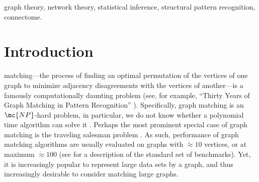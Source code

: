 \documentclass[10pt,journal,cspaper,compsoc]{IEEEtran}
\begin{document}
{%
\begin{keywords}
graph theory, network theory, statistical inference, structural pattern recognition, connectome.
\end{keywords}}


\maketitle
\IEEEdisplaynotcompsoctitleabstractindextext
\IEEEpeerreviewmaketitle



\section{Introduction}

 matching---the process of finding an optimal permutation of the vertices of one graph to minimize adjacency disagreements with the vertices of another---is a famously computationally daunting problem (see, for example, ``Thirty Years of Graph Matching in Pattern Recognition''  \cite{Conte2004}). Specifically, graph matching is an $\mc{NP}$-hard problem, in particular, we do not know whether a polynomial time algorithm can solve it \cite{Papadimitriou1998}.  Perhaps the most prominent special case of graph matching is the traveling salesman problem \cite{Burkard2009}. As such, performance of graph matching algorithms are usually evaluated on graphs with $\dot{\approx} 10$ vertices, or at maximum $\dot{\approx} 100$ (see \cite{Burkard1997} for a description of the standard set of benchmarks).  Yet, it is increasingly popular to represent large data sets by a graph, and thus increasingly desirable to consider matching large graphs.  
\end{document}
